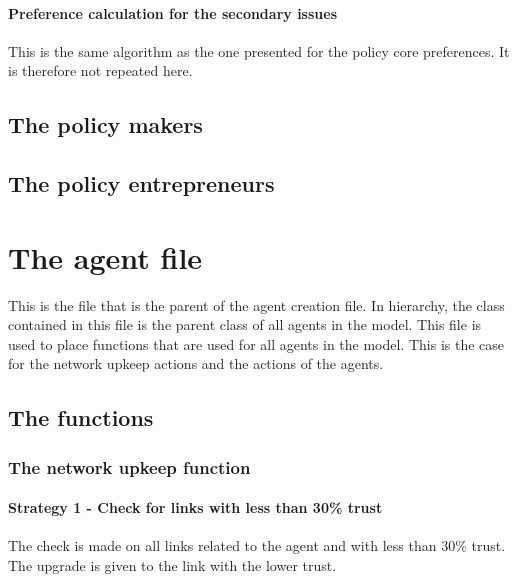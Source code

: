 \paragraph{Preference calculation for the secondary issues}

This is the same algorithm as the one presented for the policy core preferences. It is therefore not repeated here.

\subsection{The policy makers}

\subsection{The policy entrepreneurs}

%
\section{The agent file}

This is the file that is the parent of the agent creation file. In hierarchy, the class contained in this file is the parent class of all agents in the model. This file is used to place functions that are used for all agents in the model. This is the case for the network upkeep actions and the actions of the agents.

\subsection{The functions}

\subsubsection{The network upkeep function}

\paragraph{Strategy 1 - Check for links with less than 30\% trust}

The check is made on all links related to the agent and with less than 30\% trust. The upgrade is given to the link with the lower trust. 

